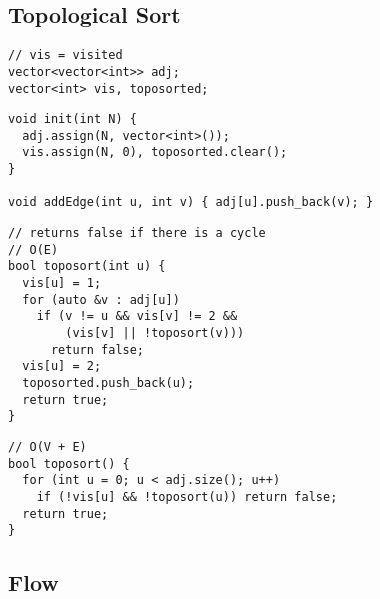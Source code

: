 \documentclass[twoside]{article}
\begin{document}
\begin{multicols*}{2}
{
\subsection*{Topological Sort}
}
\begin{verbatim}
// vis = visited
vector<vector<int>> adj;
vector<int> vis, toposorted;
\end{verbatim}
\vspace{-12pt}
\begin{verbatim}
void init(int N) {
  adj.assign(N, vector<int>());
  vis.assign(N, 0), toposorted.clear();
}

void addEdge(int u, int v) { adj[u].push_back(v); }
\end{verbatim}
\vspace{-12pt}
\begin{verbatim}
// returns false if there is a cycle
// O(E)
bool toposort(int u) {
  vis[u] = 1;
  for (auto &v : adj[u])
    if (v != u && vis[v] != 2 &&
        (vis[v] || !toposort(v)))
      return false;
  vis[u] = 2;
  toposorted.push_back(u);
  return true;
}
\end{verbatim}
\vspace{-12pt}
\begin{verbatim}
// O(V + E)
bool toposort() {
  for (int u = 0; u < adj.size(); u++)
    if (!vis[u] && !toposort(u)) return false;
  return true;
}
\end{verbatim}

{
\subsection*{Flow}
}
{
}
\end{multicols*}
\end{document}
